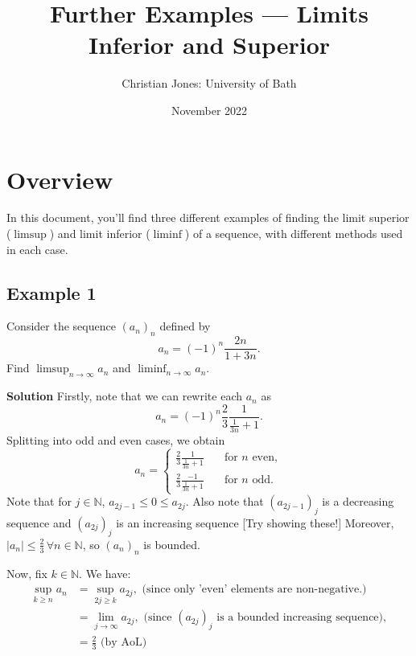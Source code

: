 \documentclass[
  12pt,
  a4paper]{extarticle}
\title{Further Examples --- Limits Inferior and Superior}
\author{Christian Jones: University of Bath}
\date{November 2022}
\theoremstyle{plain}
\theoremstyle{plain}
\theoremstyle{plain}
\theoremstyle{plain}
\theoremstyle{plain}
\theoremstyle{definition}
\theoremstyle{definition}
\theoremstyle{definition}
\theoremstyle{remark}
\let\BeginKnitrBlock\begin \let\EndKnitrBlock\end
\renewcommand{\;}{\,}
\begin{document}
\maketitle

{
\setcounter{tocdepth}{2}
\tableofcontents
}
\newpage
{}

\hypertarget{overview}{%
\section*{Overview}\label{overview}}

In this document, you'll find three different examples of finding the limit superior (\(\limsup\)) and limit inferior (\(\liminf\)) of a sequence, with different methods used in each case.

\hypertarget{example-1}{%
\subsection{Example 1}\label{example-1}}

\BeginKnitrBlock{example}
{\label{exm:ex1} }Consider the sequence \((a_n)_{n}\) defined by \[a_n = (-1)^n\frac{2n}{1+3n}.\] Find \(\limsup_{n \to \infty} a_n\) and \(\liminf_{n \to \infty} a_n\).
\EndKnitrBlock{example}

\textbf{Solution}
Firstly, note that we can rewrite each \(a_n\) as \[a_n = (-1)^n \frac{2}{3}\frac{1}{\frac{1}{3n} + 1}.\] Splitting into odd and even cases, we obtain \[a_n = \begin{cases} \frac{2}{3}\frac{1}{\frac{1}{3n} + 1} &\quad \text{for $n$ even},\\
\frac{2}{3}\frac{-1}{\frac{1}{3n} + 1} &\quad \text{for $n$ odd}.\end{cases}\] Note that for \(j \in \mathbb{N}\), \(a_{2j-1} \leq 0 \leq a_{2j}\). Also note that \((a_{2j-1})_j\) is a decreasing sequence and \((a_{2j})_{j}\) is an increasing sequence {[}Try showing these!{]} Moreover, \(\lvert a_n \rvert \leq \frac{2}{3} \; \forall n\in\mathbb{N}\), so \((a_n)_n\) is bounded.

Now, fix \(k \in \mathbb{N}\). We have:
\begin{align*}
\sup_{k\geq n}a_n &= \sup_{2j \geq k} a_{2j}, \; \; \text{(since only 'even' elements are non-negative.)}\\
&= \lim_{j \to \infty} a_{2j}, \; \; \text{(since $(a_{2j})_j$ is a bounded increasing sequence)},\\
&= \frac{2}{3} \; \; \text{(by AoL)}
\end{align*}
\end{document}
